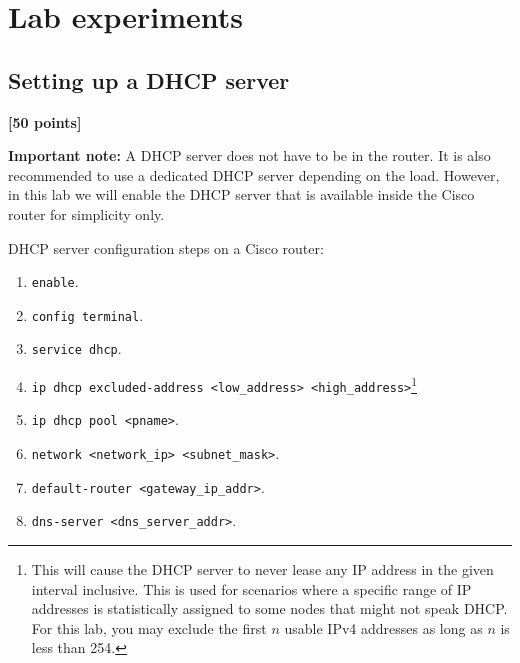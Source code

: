 \documentclass[pdftex,12pt,a4paper]{article}
\begin{document}
    \section{Lab experiments}
        \subsection{Setting up a DHCP server }
            \begin{flushright}
                \textbf{[50 points]}
            \end{flushright}

            \textbf{Important note:} A DHCP server does not have to be in the router. It
            is also recommended to use a dedicated DHCP server depending on the
            load. However, in this lab we will enable the DHCP server that is
            available inside the Cisco router for simplicity only.
            
            DHCP server configuration steps on a Cisco router:
            \begin{enumerate}
                \item \texttt{enable}.
                \item \texttt{config terminal}.
                \item \texttt{service dhcp}.
                \item \texttt{ip dhcp excluded-address <low\_address>
                    <high\_address>}\footnote{This will cause the DHCP server
                        to never lease any IP address in the given interval
                        inclusive. This is used for scenarios where a specific
                        range of IP addresses is statistically assigned to some
                    nodes that might not speak DHCP. For this lab, you may
                    exclude the first $n$ usable IPv4 addresses as long as $n$ is
                    less than 254.}
                \item \texttt{ip dhcp pool <pname>}.
                \item \texttt{network <network\_ip> <subnet\_mask>}.
                \item \texttt{default-router <gateway\_ip\_addr>}.
                \item \texttt{dns-server <dns\_server\_addr>}.
            \end{enumerate}
\end{document}

